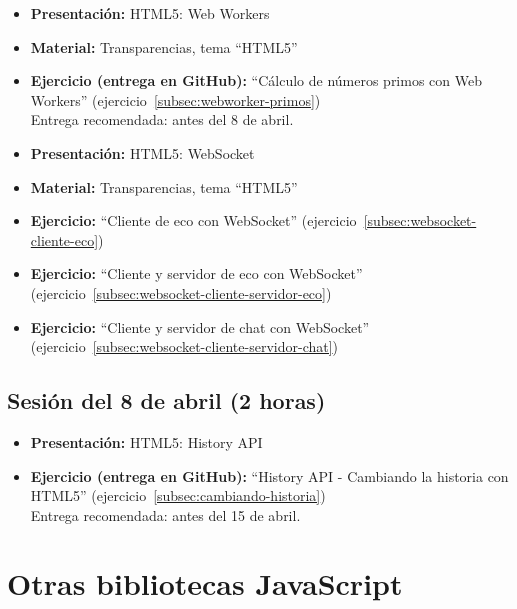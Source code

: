 \documentclass[a4paper,12pt]{report}
\begin{document}
\begin{itemize}
 \item \textbf{Presentación:} HTML5: Web Workers
 \item \textbf{Material:} Transparencias, tema ``HTML5''
 \item \textbf{Ejercicio (entrega en GitHub):} ``Cálculo de números primos con Web Workers'' (ejercicio~\ref{subsec:webworker-primos})
  \\
Entrega recomendada: antes del 8 de abril.
 \item \textbf{Presentación:} HTML5: WebSocket
 \item \textbf{Material:} Transparencias, tema ``HTML5''
 \item \textbf{Ejercicio:} ``Cliente de eco con WebSocket'' (ejercicio~\ref{subsec:websocket-cliente-eco})
 \item \textbf{Ejercicio:} ``Cliente y servidor de eco con WebSocket'' (ejercicio~\ref{subsec:websocket-cliente-servidor-eco})
 \item \textbf{Ejercicio:} ``Cliente y servidor de chat con WebSocket'' (ejercicio~\ref{subsec:websocket-cliente-servidor-chat})
\end{itemize}

\subsection{Sesión del 8 de abril (2 horas)}

\begin{itemize}
 \item \textbf{Presentación:} HTML5: History API
 \item \textbf{Ejercicio (entrega en GitHub):} ``History API - Cambiando la historia con HTML5''
(ejercicio~\ref{subsec:cambiando-historia}) \\
 Entrega recomendada: antes del 15 de abril.
\end{itemize}

\section{Otras bibliotecas JavaScript}
\end{document}

